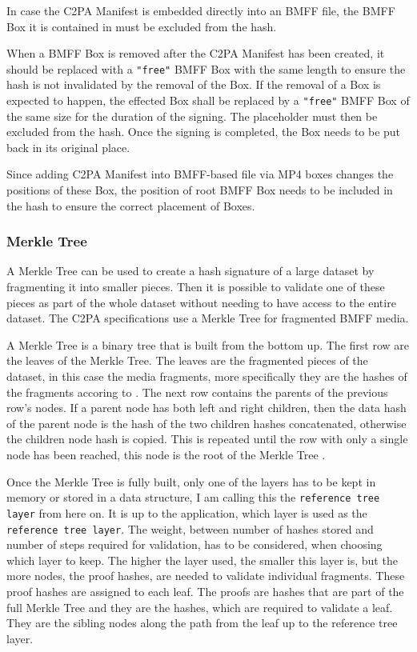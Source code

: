 In case the C2PA Manifest is embedded directly into an BMFF file, the BMFF Box it is contained in must be excluded from the hash.

When a BMFF Box is removed after the C2PA Manifest has been created, it should be replaced with a \texttt{"free"} BMFF Box with the same length to ensure the hash is not invalidated by the removal of the Box. If the removal of a Box is expected to happen, the effected Box shall be replaced by a \texttt{"free"} BMFF Box of the same size for the duration of the signing. The placeholder must then be excluded from the hash. Once the signing is completed, the Box needs to be put back in its original place.

Since adding C2PA Manifest into BMFF-based file via MP4 boxes changes the positions of these Box, the position of root BMFF Box needs to be included in the hash to ensure the correct placement of Boxes.

\subsubsection{Merkle Tree\label{sec:merkle}}

A Merkle Tree can be used to create a hash signature of a large dataset by fragmenting it into smaller pieces. Then it is possible to validate one of these pieces as part of the whole dataset without needing to have access to the entire dataset. The C2PA specifications use a Merkle Tree for fragmented BMFF media.

A Merkle Tree is a binary tree that is built from the bottom up. The first row are the leaves of the Merkle Tree. The leaves are the fragmented pieces of the dataset, in this case the media fragments, more specifically they are the hashes of the fragments accoring to . The next row contains the parents of the previous row's nodes. If a parent node has both left and right children, then the data hash of the parent node is the hash of the two children hashes concatenated, otherwise the children node hash is copied. This is repeated until the row with only a single node has been reached, this node is the root of the Merkle Tree \cite{merkle}.

Once the Merkle Tree is fully built, only one of the layers has to be kept in memory or stored in a data structure, I am calling this the \texttt{reference tree layer} from here on. It is up to the application, which layer is used as the \texttt{reference tree layer}. The weight, between number of hashes stored and number of steps required for validation, has to be considered, when choosing which layer to keep. The higher the layer used, the smaller this layer is, but the more nodes, the proof hashes, are needed to validate individual fragments. These proof hashes are assigned to each leaf. The proofs are hashes that are part of the full Merkle Tree and they are the hashes, which are required to validate a leaf. They are the sibling nodes along the path from the leaf up to the reference tree layer.

